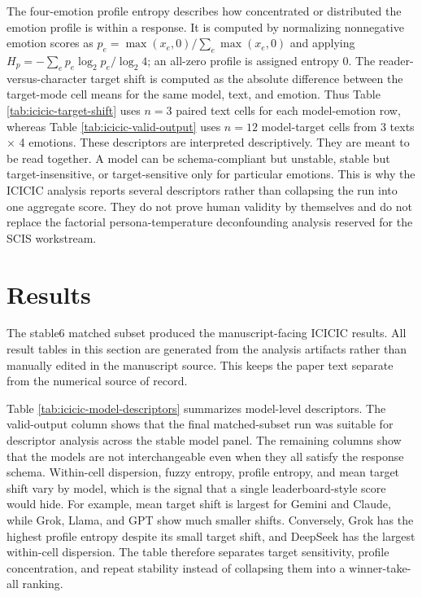 \documentclass[12pt,a4paper]{icicel}
\begin{document}
The four-emotion profile entropy describes how concentrated or distributed the
emotion profile is within a response.
It is computed by normalizing nonnegative emotion scores as
$p_e=\max(x_e,0)/\sum_e\max(x_e,0)$ and applying
$H_p=-\sum_e p_e\log_2 p_e/\log_2 4$; an all-zero profile is assigned entropy
0.
The reader-versus-character target shift is computed as the absolute difference
between the target-mode cell means for the same model, text, and emotion.
Thus Table \ref{tab:icicic-target-shift} uses $n=3$ paired text cells for each
model-emotion row, whereas Table \ref{tab:icicic-valid-output} uses $n=12$
model-target cells from 3 texts $\times$ 4 emotions.
These descriptors are interpreted descriptively.
They are meant to be read together.
A model can be schema-compliant but unstable, stable but target-insensitive, or
target-sensitive only for particular emotions.
This is why the ICICIC analysis reports several descriptors rather than
collapsing the run into one aggregate score.
They do not prove human validity by themselves and do not replace the
factorial persona-temperature deconfounding analysis reserved for the SCIS
workstream.

\section{Results}
The stable6 matched subset produced the manuscript-facing ICICIC results.
All result tables in this section are generated from the analysis artifacts
rather than manually edited in the manuscript source.
This keeps the paper text separate from the numerical source of record.

Table \ref{tab:icicic-model-descriptors} summarizes model-level descriptors.
The valid-output column shows that the final matched-subset run was suitable
for descriptor analysis across the stable model panel.
The remaining columns show that the models are not interchangeable even when
they all satisfy the response schema.
Within-cell dispersion, fuzzy entropy, profile entropy, and mean target shift
vary by model, which is the signal that a single leaderboard-style score would
hide.
For example, mean target shift is largest for Gemini and Claude, while Grok,
Llama, and GPT show much smaller shifts.
Conversely, Grok has the highest profile entropy despite its small target
shift, and DeepSeek has the largest within-cell dispersion.
The table therefore separates target sensitivity, profile concentration, and
repeat stability instead of collapsing them into a winner-take-all ranking.
\end{document}
